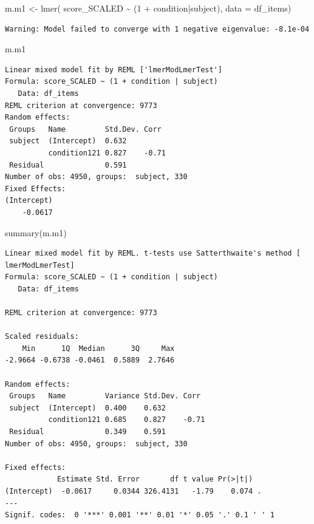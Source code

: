 \documentclass[
  letterpaper,
  DIV=11,
  numbers=noendperiod]{scrreprt}
\newenvironment{Shaded}{\begin{snugshade}}{\end{snugshade}}
\newcommand{\AttributeTok}[1]{\textcolor[rgb]{0.40,0.45,0.13}{#1}}
\newcommand{\DecValTok}[1]{\textcolor[rgb]{0.68,0.00,0.00}{#1}}
\newcommand{\FunctionTok}[1]{\textcolor[rgb]{0.28,0.35,0.67}{#1}}
\newcommand{\NormalTok}[1]{\textcolor[rgb]{0.00,0.23,0.31}{#1}}
\newcommand{\OtherTok}[1]{\textcolor[rgb]{0.00,0.23,0.31}{#1}}
\newcommand{\SpecialCharTok}[1]{\textcolor[rgb]{0.37,0.37,0.37}{#1}}
\begin{document}
\begin{Shaded}
\begin{Highlighting}[]
\NormalTok{m.m1 }\OtherTok{\textless{}{-}} \FunctionTok{lmer}\NormalTok{( score\_SCALED }\SpecialCharTok{\textasciitilde{}}\NormalTok{ (}\DecValTok{1} \SpecialCharTok{+}\NormalTok{ condition}\SpecialCharTok{|}\NormalTok{subject), }\AttributeTok{data =}\NormalTok{ df\_items)}
\end{Highlighting}
\end{Shaded}

\begin{verbatim}
Warning: Model failed to converge with 1 negative eigenvalue: -8.1e-04
\end{verbatim}

\begin{Shaded}
\begin{Highlighting}[]
\NormalTok{m.m1}
\end{Highlighting}
\end{Shaded}

\begin{verbatim}
Linear mixed model fit by REML ['lmerModLmerTest']
Formula: score_SCALED ~ (1 + condition | subject)
   Data: df_items
REML criterion at convergence: 9773
Random effects:
 Groups   Name         Std.Dev. Corr 
 subject  (Intercept)  0.632         
          condition121 0.827    -0.71
 Residual              0.591         
Number of obs: 4950, groups:  subject, 330
Fixed Effects:
(Intercept)  
    -0.0617  
\end{verbatim}

\begin{Shaded}
\begin{Highlighting}[]
\FunctionTok{summary}\NormalTok{(m.m1)}
\end{Highlighting}
\end{Shaded}

\begin{verbatim}
Linear mixed model fit by REML. t-tests use Satterthwaite's method [
lmerModLmerTest]
Formula: score_SCALED ~ (1 + condition | subject)
   Data: df_items

REML criterion at convergence: 9773

Scaled residuals: 
    Min      1Q  Median      3Q     Max 
-2.9664 -0.6738 -0.0461  0.5889  2.7646 

Random effects:
 Groups   Name         Variance Std.Dev. Corr 
 subject  (Intercept)  0.400    0.632         
          condition121 0.685    0.827    -0.71
 Residual              0.349    0.591         
Number of obs: 4950, groups:  subject, 330

Fixed effects:
            Estimate Std. Error       df t value Pr(>|t|)  
(Intercept)  -0.0617     0.0344 326.4131   -1.79    0.074 .
---
Signif. codes:  0 '***' 0.001 '**' 0.01 '*' 0.05 '.' 0.1 ' ' 1
\end{verbatim}
\end{document}
